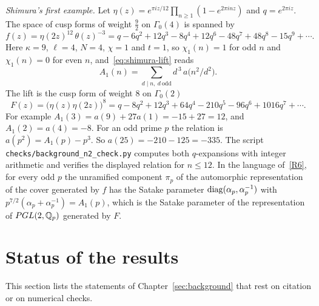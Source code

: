 \begin{example}\label{ex:shimura-lift}
\emph{Shimura's first example.} Let $\eta(z)=e^{\pi iz/12}\prod_{n\ge1}
(1-e^{2\pi inz})$ and $q=e^{2\pi iz}$. The space of cusp forms of weight
$\frac92$ on $\Gamma_0(4)$ is spanned by~\cite{Sh73}
\[
f(z)=\eta(2z)^{12}\,\theta(z)^{-3}
=q-6q^2+12q^3-8q^4+12q^6-48q^7+48q^8-15q^9+\cdots.
\]
Here $\kappa=9$, $\ell=4$, $N=4$, $\chi=1$ and $t=1$, so $\chi_1(n)=1$
for odd $n$ and $\chi_1(n)=0$ for even $n$, and~\eqref{eq:shimura-lift}
reads
\[
A_1(n)=\sum_{d\mid n,\ d\ \mathrm{odd}}d^{\,3}\,a\bigl(n^2/d^2\bigr).
\]
The lift is the cusp form of weight $8$ on $\Gamma_0(2)$
\[
F(z)=\bigl(\eta(z)\eta(2z)\bigr)^8=q-8q^2+12q^3+64q^4-210q^5-96q^6+
1016q^7+\cdots.
\]
For example $A_1(3)=a(9)+27a(1)=-15+27=12$, and $A_1(2)=a(4)=-8$. For an
odd prime $p$ the relation is $a(p^2)=A_1(p)-p^3$. So $a(25)=-210-125=
-335$. The script \texttt{checks/background\_n2\_check.py} computes both
$q$-expansions with integer arithmetic and verifies the displayed
relation for $n\le12$. In the language of~\ref{R6}, for every odd $p$
the unramified component $\pi_p$ of the automorphic representation of
the cover generated by $f$ has the Satake parameter
$\operatorname{diag}(\alpha_p,\alpha_p^{-1})$ with $p^{7/2}(\alpha_p+\alpha_p^{-1})=
A_1(p)$, which is the Satake parameter of the representation of
$PGL(2,\mathbb{Q}_p)$ generated by $F$.
\end{example}

\section{Status of the results}\label{sec:status2}

This section lists the statements of Chapter~\ref{sec:background}
that rest on citation or on numerical checks.


